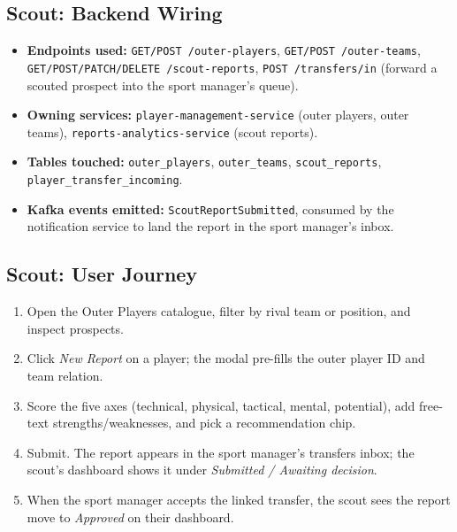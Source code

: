 \documentclass[12pt,a4paper,oneside]{report}
\begin{document}
\subsection*{Scout: Backend Wiring}
\begin{itemize}[leftmargin=*]
  \item \textbf{Endpoints used:}
        \texttt{GET/POST /outer-players},
        \texttt{GET/POST /outer-teams},
        \texttt{GET/POST/PATCH/DELETE /scout-reports},
        \texttt{POST /transfers/in} (forward a scouted prospect
        into the sport manager's queue).
  \item \textbf{Owning services:}
        \texttt{player-management-service} (outer players, outer
        teams), \texttt{reports-analytics-service} (scout reports).
  \item \textbf{Tables touched:} \texttt{outer\_players},
        \texttt{outer\_teams}, \texttt{scout\_reports},
        \texttt{player\_transfer\_incoming}.
  \item \textbf{Kafka events emitted:}
        \texttt{ScoutReportSubmitted}, consumed by the notification
        service to land the report in the sport manager's inbox.
\end{itemize}

\subsection*{Scout: User Journey}
\begin{enumerate}[leftmargin=*]
  \item Open the Outer Players catalogue, filter by rival team or
        position, and inspect prospects.
  \item Click \emph{New Report} on a player; the modal pre-fills the
        outer player ID and team relation.
  \item Score the five axes (technical, physical, tactical, mental,
        potential), add free-text strengths/weaknesses, and pick a
        recommendation chip.
  \item Submit. The report appears in the sport manager's transfers
        inbox; the scout's dashboard shows it under
        \emph{Submitted / Awaiting decision}.
  \item When the sport manager accepts the linked transfer, the
        scout sees the report move to \emph{Approved} on their
        dashboard.
\end{enumerate}
\end{document}
